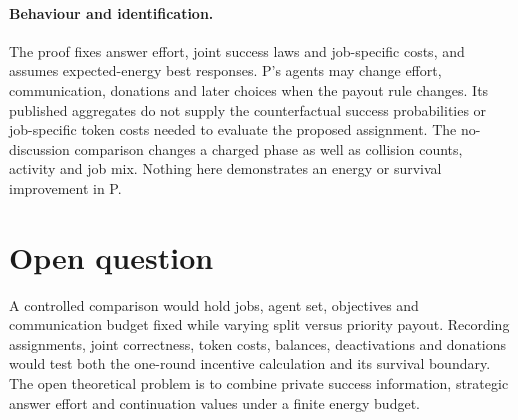 \documentclass{article}
\begin{document}
\paragraph{Behaviour and identification.} The proof fixes answer effort, joint success laws and job-specific costs, and assumes expected-energy best responses. P's agents may change effort, communication, donations and later choices when the payout rule changes. Its published aggregates do not supply the counterfactual success probabilities or job-specific token costs needed to evaluate the proposed assignment. The no-discussion comparison changes a charged phase as well as collision counts, activity and job mix. Nothing here demonstrates an energy or survival improvement in P. %

\section{Open question}

A controlled comparison would hold jobs, agent set, objectives and communication budget fixed while varying split versus priority payout. Recording assignments, joint correctness, token costs, balances, deactivations and donations would test both the one-round incentive calculation and its survival boundary. The open theoretical problem is to combine private success information, strategic answer effort and continuation values under a finite energy budget. %



\end{document}
